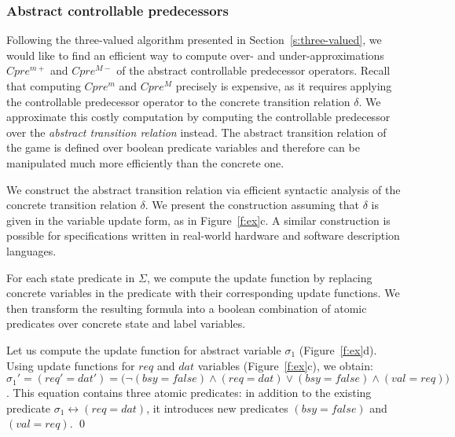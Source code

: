 \subsubsection{Abstract controllable predecessors}\label{s:cpre}

Following the three-valued algorithm presented in Section~\ref{s:three-valued}, we would like to find an efficient way to compute over- and under-approximations $Cpre^{m+}$ and $Cpre^{M-}$ of the abstract controllable predecessor operators. Recall that computing $Cpre^m$ and $Cpre^M$ precisely is expensive, as it requires applying the controllable predecessor operator to the concrete transition relation $\delta$. We approximate this costly computation by computing the controllable predecessor over the \emph{abstract transition relation} instead. The abstract transition relation of the game is defined over boolean predicate variables and therefore can be manipulated much more efficiently than the concrete one.

We construct the abstract transition relation via efficient syntactic analysis of the concrete transition relation $\delta$. We present the construction assuming that $\delta$ is given in the variable update form, as in Figure~\ref{f:ex}c. A similar construction is possible for specifications written in real-world hardware and software description languages.

For each state predicate in $\Sigma$, we compute the update function by replacing concrete variables in the predicate with their corresponding update functions. We then transform the resulting formula into a boolean combination of atomic predicates over concrete state and label variables.

\begin{ex}
    \everymath{\mathtt{\xdef\tmp{\fam\the\fam\relax}\aftergroup\tmp}}
    \everydisplay{\mathtt{\xdef\tmp{\fam\the\fam\relax}\aftergroup\tmp}}
    Let us compute the update function for abstract variable $\sigma_1$ (Figure~\ref{f:ex}d).  Using update functions for $req$ and $dat$ variables (Figure~\ref{f:ex}c), we obtain: $\sigma_1' = (req' = dat') = \big(\neg(bsy = false) \land (req=dat) \lor (bsy=false) \land (val=req)\big)$. This equation contains three atomic predicates: in addition to the existing predicate $\sigma_1 \leftrightarrow (req=dat)$, it introduces new predicates $(bsy=false)$ and $(val=req)$.  
    \qed
\end{ex}

